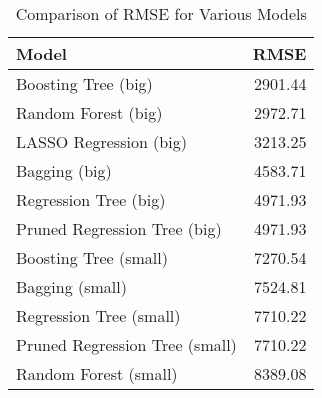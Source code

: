 \begin{table}[ht]
\centering
\caption{Comparison of RMSE for Various Models} 
\label{tab:rmse_comp}
\begin{tabular}{lr}
  \hline
Model & RMSE \\ 
  \hline
Boosting Tree (big) & 2901.44 \\ 
  Random Forest (big) & 2972.71 \\ 
  LASSO Regression (big) & 3213.25 \\ 
  Bagging (big) & 4583.71 \\ 
  Regression Tree (big) & 4971.93 \\ 
  Pruned Regression Tree (big) & 4971.93 \\ 
  Boosting Tree (small) & 7270.54 \\ 
  Bagging (small) & 7524.81 \\ 
  Regression Tree (small) & 7710.22 \\ 
  Pruned Regression Tree (small) & 7710.22 \\ 
  Random Forest (small) & 8389.08 \\ 
   \hline
\end{tabular}
\end{table}
